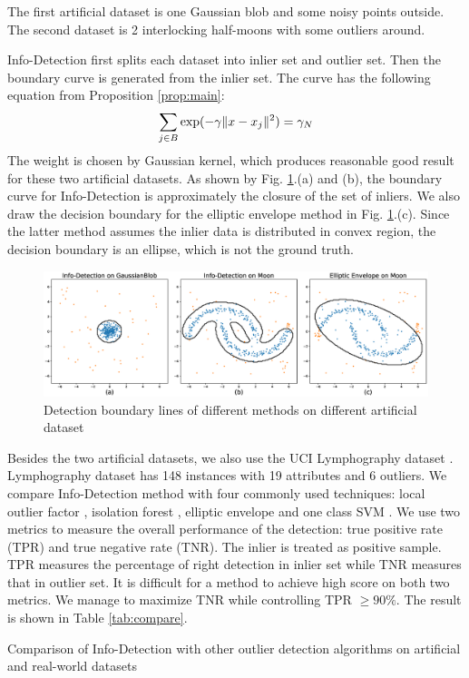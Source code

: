 \documentclass[runningheads]{llncs}
\begin{document}
The first artificial dataset is one Gaussian blob and some noisy points outside.
The second dataset is 2 interlocking half-moons with some outliers around.

Info-Detection first splits each dataset into inlier set and outlier set. Then the boundary curve is generated from the inlier set. The curve has the following equation from Proposition \ref{prop:main}:
\begin{equation}
\sum_{j \in B} \exp(-\gamma \lVert x - x_j\rVert^2)= \gamma_N
\end{equation}
The weight is chosen by Gaussian kernel, which produces reasonable good result for these two artificial datasets. As shown by Fig. \ref{fig:boundary}.(a) and (b), the boundary curve for Info-Detection is approximately the closure of the set of inliers. We also draw the decision boundary for the elliptic envelope method in Fig. \ref{fig:boundary}.(c). Since the latter method assumes the inlier data is distributed in convex region, the decision boundary is an ellipse, which is not the ground truth.
\begin{figure}[!ht]
	\centering
	\includegraphics[width=\textwidth]{pic/outlier_boundary_illustration.eps}
	\caption{Detection boundary lines of different methods on different artificial dataset}	\label{fig:boundary}
\end{figure}

Besides the two artificial datasets, we also use the UCI Lymphography dataset \cite{hics}. Lymphography dataset has 148 instances with 19 attributes and 6 outliers. We compare Info-Detection method with four commonly used techniques: local outlier factor \cite{Breunig}, isolation forest \cite{if}, elliptic envelope \cite{rousseeuw1999fast} and one class SVM \cite{svm}. We use two metrics to measure the overall performance of the detection: true positive rate (TPR) and true negative rate (TNR). The inlier is treated as positive sample. TPR measures the percentage of right detection in inlier set while TNR measures that in outlier set. It is difficult for a method to achieve high score on both two metrics. We manage to maximize TNR while controlling TPR $\geq 90\%$. The result is shown in Table \ref{tab:compare}.
\begin{table}[!ht]
\centering
{}
\caption{Comparison of Info-Detection with other outlier detection algorithms on artificial and real-world datasets}\label{tab:compare}
\end{table}
\end{document}
